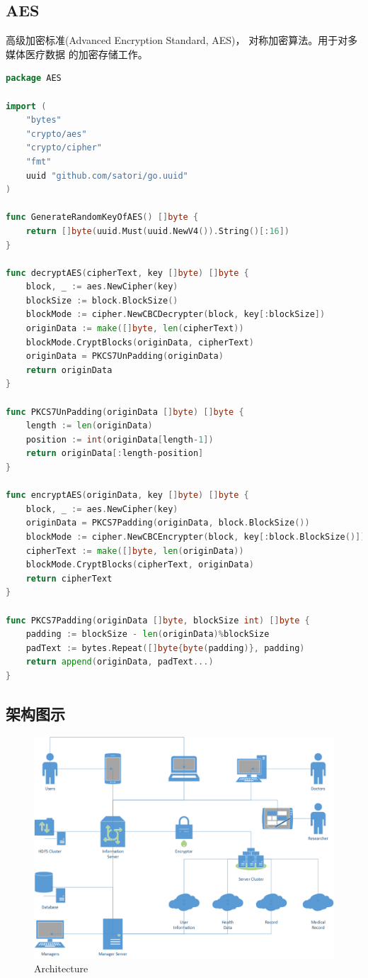 \documentclass[UTF8]{ctexart}
\begin{document}
    \subsection{AES}
    \par
    高级加密标准(Advanced Encryption Standard, AES)，
    对称加密算法。用于对多媒体医疗数据
    的加密存储工作。
    \begin{lstlisting}[language=Go]
package AES

import (
	"bytes"
	"crypto/aes"
	"crypto/cipher"
	"fmt"
	uuid "github.com/satori/go.uuid"
)

func GenerateRandomKeyOfAES() []byte {
	return []byte(uuid.Must(uuid.NewV4()).String()[:16])
}

func decryptAES(cipherText, key []byte) []byte {
	block, _ := aes.NewCipher(key)
	blockSize := block.BlockSize()
	blockMode := cipher.NewCBCDecrypter(block, key[:blockSize])
	originData := make([]byte, len(cipherText))
	blockMode.CryptBlocks(originData, cipherText)
	originData = PKCS7UnPadding(originData)
	return originData
}

func PKCS7UnPadding(originData []byte) []byte {
	length := len(originData)
	position := int(originData[length-1])
	return originData[:length-position]
}

func encryptAES(originData, key []byte) []byte {
	block, _ := aes.NewCipher(key)
	originData = PKCS7Padding(originData, block.BlockSize())
	blockMode := cipher.NewCBCEncrypter(block, key[:block.BlockSize()])
	cipherText := make([]byte, len(originData))
	blockMode.CryptBlocks(cipherText, originData)
	return cipherText
}

func PKCS7Padding(originData []byte, blockSize int) []byte {
	padding := blockSize - len(originData)%blockSize
	padText := bytes.Repeat([]byte{byte(padding)}, padding)
	return append(originData, padText...)
}
    \end{lstlisting}

    \subsection{架构图示}
    \begin{figure}[H]
        \centering
        \includegraphics[width=14cm]{figures/arch.png}
        \caption{Architecture}
    \end{figure} 
    \par
\end{document}
